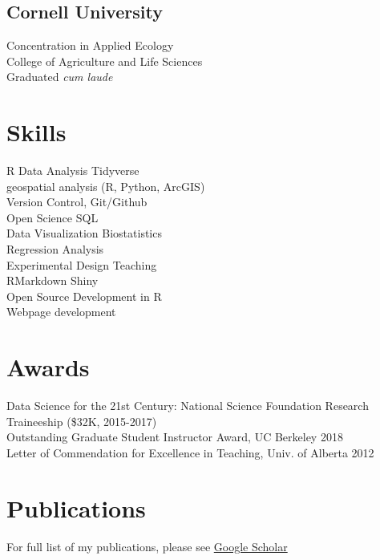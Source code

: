 \documentclass[]{deedy-resume-openfont}
\begin{document}
\begin{minipage}[t]{0.32\textwidth}
\subsection{Cornell University}
Concentration in Applied Ecology \\
College of Agriculture and Life Sciences \\
Graduated \textit{cum laude}
\sectionsep


\section{Skills}
\textbullet{} R \textbullet{} Data Analysis \textbullet{} Tidyverse \\\textbullet{} geospatial analysis (R, Python, ArcGIS) \\\textbullet{} Version Control, Git/Github \\\textbullet{} Open Science \textbullet{} SQL \\\textbullet{} Data Visualization \textbullet{} Biostatistics \\\textbullet{} Regression Analysis \\\textbullet{} Experimental Design \textbullet{} Teaching \\\textbullet{} RMarkdown \textbullet{} Shiny \\\textbullet{} Open Source Development in R \\ \textbullet{} Webpage development
\sectionsep


\section{Awards}

\textbullet{} Data Science for the 21st Century: National Science Foundation Research Traineeship (\$32K, 2015-2017) \\
\textbullet{} Outstanding Graduate Student Instructor Award, UC Berkeley 2018\\
\textbullet{} Letter of Commendation for Excellence in Teaching, Univ. of Alberta 2012\\
\sectionsep

\section{Publications}
For full list of my publications, please see \href{https://scholar.google.com/citations?user=0BKLXCUAAAAJ}{Google Scholar \faGraduationCap} 

%
%

\end{minipage} 
\end{document}
